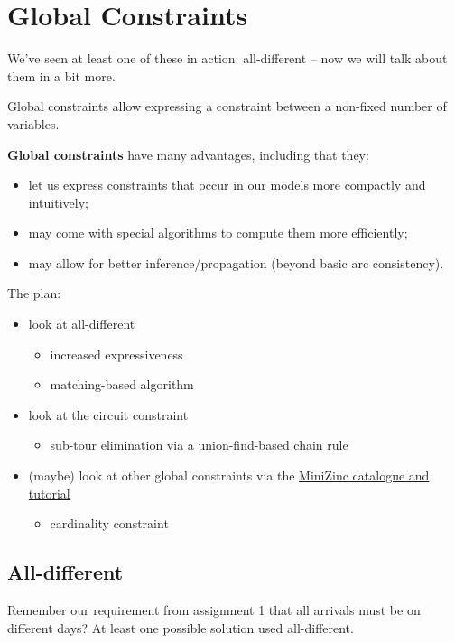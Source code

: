 \documentclass[11pt]{article}
\begin{document}
\section{Global Constraints}

We've seen at least one of these in action: all-different -- now we will talk about them in a bit more.

Global constraints allow expressing a constraint between a non-fixed number of variables.

\textbf{Global constraints} have many advantages, including that they:
\begin{itemize}
    \item let us express constraints that occur in our models more compactly and intuitively;
    \item may come with special algorithms to compute them more efficiently;
    \item may allow for better inference/propagation (beyond basic arc consistency).
\end{itemize}

The plan:
\begin{itemize}
    \item look at all-different
    \begin{itemize}
        \item increased expressiveness
        \item matching-based algorithm
    \end{itemize}
    \item look at the circuit constraint
    \begin{itemize}
        \item sub-tour elimination via a union-find-based chain rule
    \end{itemize}
    \item (maybe) look at other global constraints via the \href{http://www.dcs.gla.ac.uk/~pat/cpM/minizincCPM/tutorial/minizinc-tute.pdf}{MiniZinc catalogue and tutorial}
    \begin{itemize}
        \item cardinality constraint
    \end{itemize}
\end{itemize}

\subsection{All-different}

Remember our requirement from assignment 1 that all arrivals must be on different days? At least one possible solution used all-different.
\end{document}

